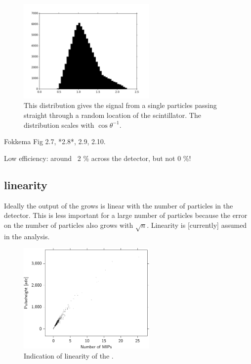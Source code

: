 \begin{figure}
    \centering
    \includegraphics[width=0.6\textwidth]{plots/response/signal_efficiency.pdf}
    \caption{ This distribution gives
             the signal from a single particles passing straight through
             a random location of the scintillator. The distribution
             scales with $\cos{\theta}^{-1}$.}
    \label{fig:signal_efficiency}
\end{figure}


Fokkema Fig 2.7, *2.8*, 2.9, 2.10.

Low efficiency: around ~2 \% across the detector, but not 0 \%!


\subsection{\pmt linearity}

Ideally the output of the \pmt grows is linear with the number of
particles in the detector. This is less important for a large number of
particles because the error on the number of particles also grows with
$\sqrt{n}$. Linearity is [currently] assumed in the analysis.

\begin{figure}
    \centering
    \includegraphics[width=0.6\textwidth]{plots/response/ph_vs_pi.pdf}
    \caption{
             Indication of linearity of the \pmt.}
    \label{fig:transport_time}
\end{figure}


